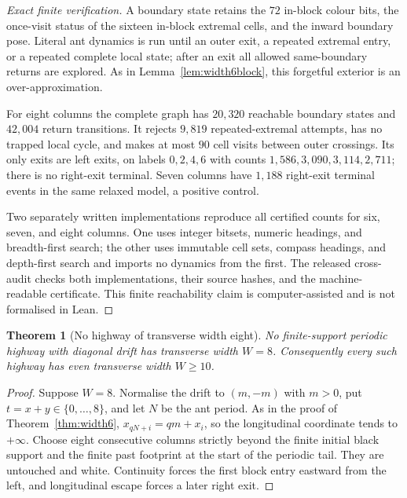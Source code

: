 \documentclass[11pt,letterpaper]{article}
\theoremstyle{plain}
\newtheorem{theorem}{Theorem}[section]
\theoremstyle{definition}
\begin{document}
\begin{NoHyper}
\begin{proof}[Exact finite verification]
A boundary state retains the $72$ in-block colour bits, the once-visit status of the
sixteen in-block extremal cells, and the inward boundary pose.  Literal ant dynamics
is run until an outer exit, a repeated extremal entry, or a repeated complete local
state; after an exit all allowed same-boundary returns are explored.  As in
Lemma~\ref{lem:width6block}, this forgetful exterior is an over-approximation.

For eight columns the complete graph has $20{,}320$ reachable boundary states and
$42{,}004$ return transitions.  It rejects $9{,}819$ repeated-extremal attempts, has
no trapped local cycle, and makes at most $90$ cell visits between outer crossings.
Its only exits are left exits, on labels $0,2,4,6$ with counts
$1{,}586,3{,}090,3{,}114,2{,}711$; there is no right-exit terminal.  Seven columns
have $1{,}188$ right-exit terminal events in the same relaxed model, a positive
control.

Two separately written implementations reproduce all certified counts for six,
seven, and eight columns.  One uses integer bitsets, numeric headings, and
breadth-first search; the other uses immutable cell sets, compass headings, and
depth-first search and imports no dynamics from the first.  The released cross-audit
checks both implementations, their source hashes, and the machine-readable
certificate.  This finite reachability claim is computer-assisted and is not
formalised in Lean.
\end{proof}

\begin{theorem}[No highway of transverse width eight]\label{thm:width8}
No finite-support periodic highway with diagonal drift has transverse width $W=8$.
Consequently every such highway has even transverse width $W\ge10$.
\end{theorem}

\begin{proof}
Suppose $W=8$.  Normalise the drift to $(m,-m)$ with $m>0$, put
$t=x+y\in\{0,\ldots,8\}$, and let $N$ be the ant period.  As in the proof of
Theorem~\ref{thm:width6}, $x_{qN+i}=qm+x_i$, so the longitudinal coordinate tends to
$+\infty$.  Choose eight consecutive columns strictly beyond the finite initial
black support and the finite past footprint at the start of the periodic tail.
They are untouched and white.  Continuity forces the first block entry eastward
from the left, and longitudinal escape forces a later right exit.


\end{proof}
\end{NoHyper}
\end{document}
